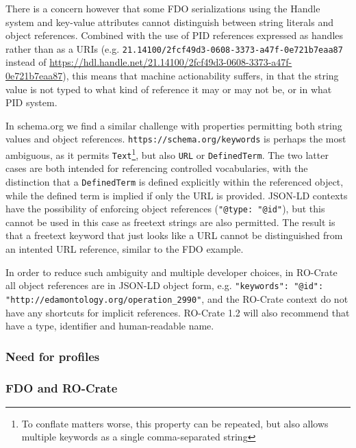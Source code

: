 There is a concern however that some FDO serializations using the Handle system and key-value attributes cannot distinguish between string literals and object references. Combined with the use of PID references expressed as handles rather than as a URIs (e.g. \texttt{21.14100/2fcf49d3-0608-3373-a47f-0e721b7eaa87} instead of \url{https://hdl.handle.net/21.14100/2fcf49d3-0608-3373-a47f-0e721b7eaa87}), this means that machine actionability suffers, in that the string value is not typed to what kind of reference it may or may not be, or in what PID system.

In schema.org we find a similar challenge with properties permitting both string values and object references. \texttt{https://schema.org/keywords} is perhaps the most ambiguous, as it permits \texttt{Text}\footnote{To conflate matters worse, this property can be repeated, but also allows multiple keywords as a single comma-separated string}, but also \texttt{URL} or \texttt{DefinedTerm}. The two latter cases are both intended for referencing controlled vocabularies, with the distinction that a \texttt{DefinedTerm} is defined explicitly within the referenced object, while the defined term is implied if only the URL is provided. JSON-LD contexts have the possibility of enforcing object references (\texttt{"@type: "@id"}), but this cannot be used in this case as freetext strings are also permitted. The result is that a freetext keyword that just looks like a URL cannot be distinguished from an intented URL reference, similar to the FDO example.

In order to reduce such ambiguity and multiple developer choices, in RO-Crate all object references are in JSON-LD object form, e.g. \texttt{"keywords": {"@id": "http://edamontology.org/operation_2990"}}, and the RO-Crate context do not have any  shortcuts for implicit references. RO-Crate 1.2 will also recommend that  have a type, identifier and human-readable name. 


\subsubsection{Need for profiles}





\subsubsection{FDO and RO-Crate}



